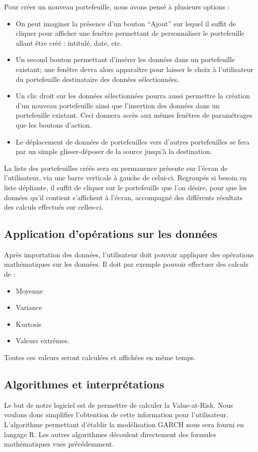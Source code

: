 		Pour créer un nouveau portefeuille, nous avons pensé à plusieurs options :
		\begin{itemize}
			\item On peut imaginer la présence d'un bouton “Ajout” sur lequel il suffit de cliquer pour afficher une fenêtre permettant de personnaliser le portefeuille allant être créé : intitulé, date, etc.
			\item Un second bouton permettant d'insérer les données dans un portefeuille existant; une fenêtre devra alors apparaître pour laisser le choix à l'utilisateur du portefeuille destinataire des données sélectionnées.
			\item Un clic droit sur les données sélectionnées pourra aussi permettre la création d'un nouveau portefeuille ainsi que l'insertion des données dans un portefeuille existant. Ceci donnera accès aux mêmes fenêtres de paramétrages que les boutons d'action.
			\item Le déplacement de données de portefeuilles vers d'autres portefeuilles se fera par un simple glisser-déposer de la source jusqu'à la destination. 
		\end{itemize}

		La liste des portefeuilles créés sera en permanence présente sur l'écran de l'utilisateur, via une barre verticale à gauche de celui-ci.
		Regroupés si besoin en liste dépliante, il suffit de cliquer sur le portefeuille que l'on désire, pour que les données qu'il contient s'affichent à l'écran, accompagné des différents résultats des calculs effectués sur celles-ci. 



	\subsection{Application d'opérations sur les données}
		Après importation des données, l'utilisateur doit pouvoir appliquer des opérations mathématiques sur les données.
		Il doit par exemple pouvoir effectuer des calculs de :
		\begin{itemize}
			\item Moyenne
			\item Variance
			\item Kurtosis
			\item Valeurs extrêmes.
		\end{itemize}
		Toutes ces valeurs seront calculées et affichées en même temps.


	\subsection{Algorithmes et interprétations}
		Le but de notre logiciel est de permettre de calculer la Value-at-Risk. Nous voulons donc simplifier l'obtention de cette information pour l'utilisateur. L'algorithme permettant d'établir la modélisation GARCH nous sera fourni en langage R. Les autres algorithmes découlent directement des formules mathématiques vues précédemment.

